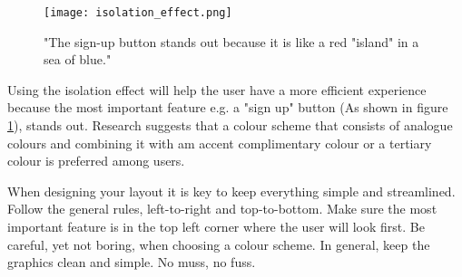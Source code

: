 \begin{figure}[H]
\centering
\texttt{[image: isolation\_effect.png]}
\caption{"The sign-up button stands out because it is like a red "island" in a sea of blue." \cite{ColorMeaning}}
\label{isolationFig}
\end{figure}

Using the isolation effect will help the user have a more efficient experience because the most important feature e.g. a "sign up" button (As shown in figure \ref{isolationFig}), stands out. \cite{ColorMeaning} 
Research suggests that a colour scheme that consists of analogue colours and combining it with am accent complimentary colour or a tertiary colour is preferred among users. \cite{ColorMeaning} 

When designing your layout it is key to keep everything simple and streamlined. 
Follow the general rules, left-to-right and top-to-bottom. Make sure the most important feature is in the top left corner where the user will look first.\cite{Sardo}
Be careful, yet not boring, when choosing a colour scheme. In general, keep the graphics clean and simple. No muss, no fuss. 